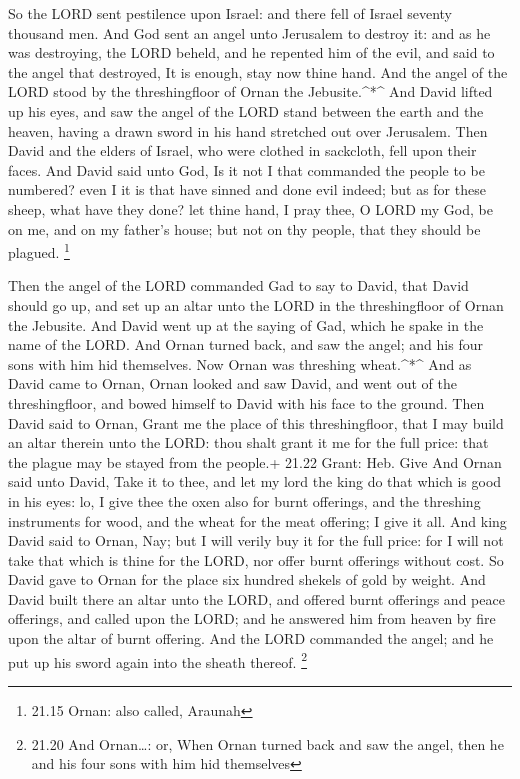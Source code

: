  So the LORD sent pestilence upon Israel: and there fell of
Israel seventy thousand men.  And God sent an angel unto
Jerusalem to destroy it: and as he was destroying, the LORD beheld, and
he repented him of the evil, and said to the angel that destroyed, It is
enough, stay now thine hand. And the angel of the LORD stood by the
threshingfloor of Ornan the Jebusite.\^{}*\^{}  And David
lifted up his eyes, and saw the angel of the LORD stand between the
earth and the heaven, having a drawn sword in his hand stretched out
over Jerusalem. Then David and the elders of Israel, who were clothed in
sackcloth, fell upon their faces.  And David said unto God,
Is it not I that commanded the people to be numbered? even I it is that
have sinned and done evil indeed; but as for these sheep, what have they
done? let thine hand, I pray thee, O LORD my God, be on me, and on my
father's house; but not on thy people, that they should be plagued.
\footnote{21.15 Ornan: also called, Araunah}

 Then the angel of the LORD commanded Gad to say to David,
that David should go up, and set up an altar unto the LORD in the
threshingfloor of Ornan the Jebusite.  And David went up at
the saying of Gad, which he spake in the name of the LORD. 
And Ornan turned back, and saw the angel; and his four sons with him hid
themselves. Now Ornan was threshing wheat.\^{}*\^{}  And as
David came to Ornan, Ornan looked and saw David, and went out of the
threshingfloor, and bowed himself to David with his face to the ground.
 Then David said to Ornan, Grant me the place of this
threshingfloor, that I may build an altar therein unto the LORD: thou
shalt grant it me for the full price: that the plague may be stayed from
the people.+ 21.22 Grant: Heb. Give  And Ornan said unto
David, Take it to thee, and let my lord the king do that which is good
in his eyes: lo, I give thee the oxen also for burnt offerings, and the
threshing instruments for wood, and the wheat for the meat offering; I
give it all.  And king David said to Ornan, Nay; but I will
verily buy it for the full price: for I will not take that which is
thine for the LORD, nor offer burnt offerings without cost.
 So David gave to Ornan for the place six hundred shekels
of gold by weight.  And David built there an altar unto the
LORD, and offered burnt offerings and peace offerings, and called upon
the LORD; and he answered him from heaven by fire upon the altar of
burnt offering.  And the LORD commanded the angel; and he
put up his sword again into the sheath thereof. \footnote{21.20 And
  Ornan\ldots: or, When Ornan turned back and saw the angel, then he and
  his four sons with him hid themselves}

